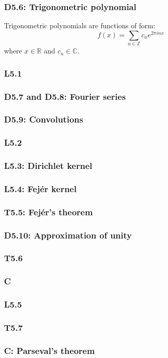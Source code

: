 \documentclass{article}
\begin{document}
\begin{multicols*}{3}
\subsubsection*{D5.6: Trigonometric polynomial}
Trigonometric polynomials are functions of form:
$$f(x)=\sum_{n\in\mathbb{Z}}
c_n e^{2\pi inx}$$
where $x\in\mathbb{R}$ and $c_n\in\mathbb{C}$.

\subsubsection*{L5.1}

\subsubsection*{D5.7 and D5.8: Fourier series}

\subsubsection*{D5.9: Convolutions}

\subsubsection*{L5.2}

\subsubsection*{L5.3: Dirichlet kernel}

\subsubsection*{L5.4: Fej\'er kernel}

\subsubsection*{T5.5: Fej\'er's theorem}

\subsubsection*{D5.10: Approximation of unity}

\subsubsection*{T5.6}

\subsubsection*{C}

\subsubsection*{L5.5}

\subsubsection*{T5.7}

\subsubsection*{C: Parseval's theorem}

\end{multicols*}
\end{document}
